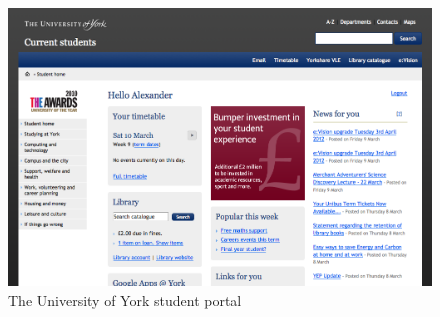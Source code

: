 \documentclass[twoside,draft]{scrartcl}
\begin{document}










\begin{figure}
  \centering
  \includegraphics[width=0.9\linewidth]{images/2012_03_10_yorkacuk_students.png}
  \caption{The University of York student portal}
  \label{yorkacuk_student_portal}
\end{figure}
\end{document}
